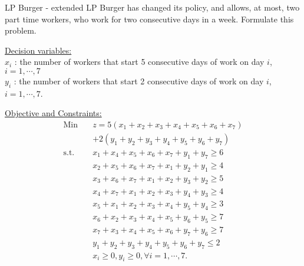 \begin{examplewithallcode}{LP Burger - extended}
    {}
    {}
    {}
    LP Burger has changed its policy, and allows, at most, two part time workers, who work for two consecutive days in a week.  Formulate this problem.
    \end{examplewithallcode}
    \begin{solution}
    \underline{Decision variables:} \\
    $x_i$ : the number of workers that start 5 consecutive days of work on day $i$, $ i = 1,\cdots,7$ \\
    $y_i$ : the number of workers that start 2 consecutive days of work on day $i$, $ i = 1,\cdots,7$.
    
    \smallskip \underline{Objective and Constraints:}
    \begin{align*}
    \mbox{Min~~ } & z = 5(x_1 + x_2 + x_3 + x_4 + x_5 + x_6 + x_7) \\
    & + 2(y_1 + y_2 + y_3 + y_4 + y_5 + y_6 + y_7) \nonumber \\
    \mbox{s.t.~~} & x_1 + x_4 + x_5 + x_6 + x_7 + y_1 + y_7 \ge 6 \\
    & x_2 + x_5 + x_6 + x_7 + x_1 + y_2 + y_1 \ge 4 \\
    &           x_3 + x_6 + x_7 + x_1 + x_2 + y_3 + y_2 \ge 5 \\
    &           x_4 + x_7 + x_1 + x_2 + x_3 + y_4 + y_3 \ge 4 \\
    &           x_5 + x_1 + x_2 + x_3 + x_4 + y_5 + y_4 \ge 3 \\
    &           x_6 + x_2 + x_3 + x_4 + x_5 + y_6 + y_5 \ge 7 \\
    &           x_7 + x_3 + x_4 + x_5 + x_6 + y_7 + y_6 \ge 7 \\
    &           y_1 + y_2 + y_3 + y_4 + y_5 + y_6 + y_7 \le 2 \\
    &           x_i \ge 0, y_i \ge 0, \forall i = 1,\cdots,7.
    \end{align*}
    \end{solution}
    